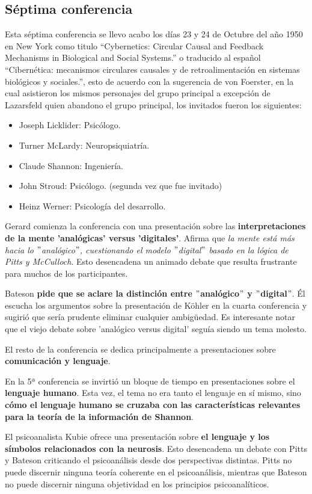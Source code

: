 \documentclass[11pt]{article}
\begin{document}
 		\subsection{Séptima conferencia}
		Esta séptima conferencia se llevo acabo los días 23 y 24 de Octubre del año 1950 en New York como titulo ``Cybernetics: Circular Causal and Feedback Mechanisms in Biological and Social Systems.'' o traducido al español ``Cibernética: mecanismos circulares causales y de retroalimentación en sistemas biológicos y sociales.'', esto de acuerdo con la sugerencia de von Foerster, en la cual asistieron los mismos personajes del grupo principal a excepción de Lazarsfeld quien abandono el grupo principal, los invitados fueron los siguientes:
		\begin{itemize}
			\item Joseph Licklider: Psicólogo.
    		\item Turner McLardy: Neuropsiquiatría.
    		\item Claude Shannon: Ingeniería.
			\item John Stroud: Psicólogo. (segunda vez que fue invitado)
			\item Heinz Werner: Psicología del desarrollo.
		\end{itemize}
 		Gerard comienza la conferencia con una presentación sobre las \textbf{interpretaciones de la mente 'analógicas' versus 'digitales'}. Afirma que \textit{la mente está más hacia lo $"$analógico$"$, cuestionando el modelo $"$digital$"$ basado en la lógica de Pitts y McCulloch}. Esto desencadena un animado debate que resulta frustrante para muchos de los participantes.\par
		Bateson\textbf{ pide que se aclare la distinción entre $"$analógico$"$ y $"$digital$"$}. Él escucha los argumentos sobre la presentación de Köhler en la cuarta conferencia y sugirió que sería prudente eliminar cualquier ambigüedad. Es interesante notar que el viejo debate sobre 'analógico versus digital' seguía siendo un tema molesto.\par
		El resto de la conferencia se dedica principalmente a presentaciones sobre \textbf{comunicación y lenguaje}.\par
		En la 5ª conferencia se invirtió un bloque de tiempo en presentaciones sobre el \textbf{lenguaje humano}. Esta vez, el tema no era tanto el lenguaje en sí mismo, sino \textbf{cómo el lenguaje humano se cruzaba con las características relevantes para la teoría de la información de Shannon}.\par
		El psicoanalista Kubie ofrece una presentación sobre \textbf{el lenguaje y los símbolos relacionados con la neurosis}. Esto desencadena un debate con Pitts y Bateson criticando el psicoanálisis desde dos perspectivas distintas. Pitts no puede discernir ninguna teoría coherente en el psicoanálisis, mientras que Bateson no puede discernir ninguna objetividad en los principios psicoanalíticos.\par
\end{document}
